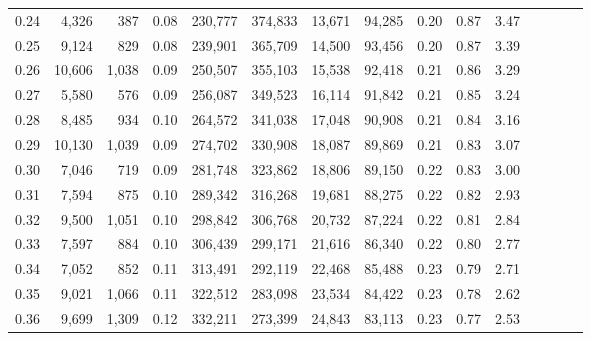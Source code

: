 \begin{tabular}{rrrcrrrrrrrrrrr}
0.24 &   4,326 &     387 &                                       0.08 &  230,777 &  374,833 &   13,671 &   94,285 &  0.20 &  0.87 &                         3.47 \\
0.25 &   9,124 &     829 &                                       0.08 &  239,901 &  365,709 &   14,500 &   93,456 &  0.20 &  0.87 &                         3.39 \\
0.26 &  10,606 &   1,038 &                                       0.09 &  250,507 &  355,103 &   15,538 &   92,418 &  0.21 &  0.86 &                         3.29 \\
0.27 &   5,580 &     576 &                                       0.09 &  256,087 &  349,523 &   16,114 &   91,842 &  0.21 &  0.85 &                         3.24 \\
0.28 &   8,485 &     934 &                                       0.10 &  264,572 &  341,038 &   17,048 &   90,908 &  0.21 &  0.84 &                         3.16 \\
0.29 &  10,130 &   1,039 &                                       0.09 &  274,702 &  330,908 &   18,087 &   89,869 &  0.21 &  0.83 &                         3.07 \\
0.30 &   7,046 &     719 &                                       0.09 &  281,748 &  323,862 &   18,806 &   89,150 &  0.22 &  0.83 &                         3.00 \\
0.31 &   7,594 &     875 &                                       0.10 &  289,342 &  316,268 &   19,681 &   88,275 &  0.22 &  0.82 &                         2.93 \\
0.32 &   9,500 &   1,051 &                                       0.10 &  298,842 &  306,768 &   20,732 &   87,224 &  0.22 &  0.81 &                         2.84 \\
0.33 &   7,597 &     884 &                                       0.10 &  306,439 &  299,171 &   21,616 &   86,340 &  0.22 &  0.80 &                         2.77 \\
0.34 &   7,052 &     852 &                                       0.11 &  313,491 &  292,119 &   22,468 &   85,488 &  0.23 &  0.79 &                         2.71 \\
0.35 &   9,021 &   1,066 &                                       0.11 &  322,512 &  283,098 &   23,534 &   84,422 &  0.23 &  0.78 &                         2.62 \\
0.36 &   9,699 &   1,309 &                                       0.12 &  332,211 &  273,399 &   24,843 &   83,113 &  0.23 &  0.77 &                         2.53 \\

\end{tabular}
